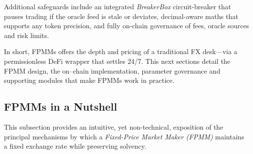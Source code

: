 \documentclass[a4paper]{article}
\theoremstyle{definition}
\begin{document}
Additional safeguards include an integrated \emph{BreakerBox} circuit-breaker that pauses trading if the oracle feed is stale or deviates, decimal-aware maths that supports any token precision, and fully on-chain governance of fees, oracle sources and risk limits.

In short, FPMMs offers the depth and pricing of a traditional FX desk—via a permissionless DeFi wrapper that settles 24/7. This next sections detail the FPMM design, the on–chain implementation, parameter governance and supporting modules that make FPMMs work in practice.  

\subsection{FPMMs in a Nutshell}
\noindent
This subsection provides an intuitive, yet non-technical, exposition of the principal mechanisms by which a \emph{Fixed-Price Market Maker (FPMM)} maintains a fixed exchange rate while preserving solvency.
\end{document}
